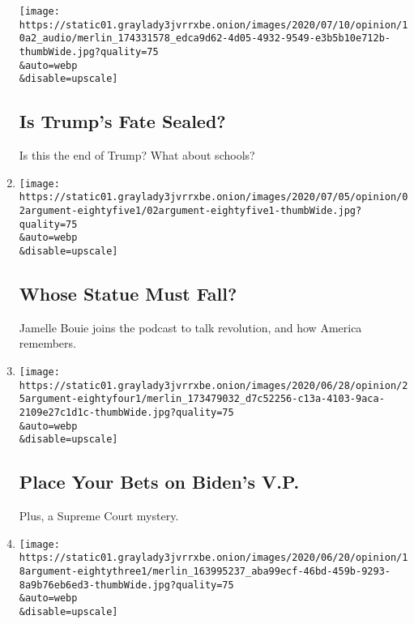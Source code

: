 \begin{enumerate}
  \texttt{[image: https://static01.graylady3jvrrxbe.onion/images/2020/07/10/opinion/10a2\_audio/merlin\_174331578\_edca9d62-4d05-4932-9549-e3b5b10e712b-thumbWide.jpg?quality=75\\\&auto=webp\\\&disable=upscale]}

  \hypertarget{is-trumps-fate-sealed}{%
  \subsection{Is Trump's Fate Sealed?}\label{is-trumps-fate-sealed}}

  Is this the end of Trump? What about schools?
\item
  \href{/2020/07/02/opinion/the-argument-protest-statue-revolution.html}{}

  \texttt{[image: https://static01.graylady3jvrrxbe.onion/images/2020/07/05/opinion/02argument-eightyfive1/02argument-eightyfive1-thumbWide.jpg?quality=75\\\&auto=webp\\\&disable=upscale]}

  \hypertarget{whose-statue-must-fall}{%
  \subsection{Whose Statue Must Fall?}\label{whose-statue-must-fall}}

  Jamelle Bouie joins the podcast to talk revolution, and how America
  remembers.
\item
  \href{/2020/06/25/opinion/the-argument-biden-vice-president-supreme-court.html}{}

  \texttt{[image: https://static01.graylady3jvrrxbe.onion/images/2020/06/28/opinion/25argument-eightyfour1/merlin\_173479032\_d7c52256-c13a-4103-9aca-2109e27c1d1c-thumbWide.jpg?quality=75\\\&auto=webp\\\&disable=upscale]}

  \hypertarget{place-your-bets-on-bidens-vp}{%
  \subsection{Place Your Bets on Biden's
  V.P.}\label{place-your-bets-on-bidens-vp}}

  Plus, a Supreme Court mystery.
\item
  \href{/2020/06/18/opinion/the-argument-tom-cotton-resignation.html}{}

  \texttt{[image: https://static01.graylady3jvrrxbe.onion/images/2020/06/20/opinion/18argument-eightythree1/merlin\_163995237\_aba99ecf-46bd-459b-9293-8a9b76eb6ed3-thumbWide.jpg?quality=75\\\&auto=webp\\\&disable=upscale]}

  \hypertarget{which-opinions-are-out-of-bounds}{%
}
\end{enumerate}

